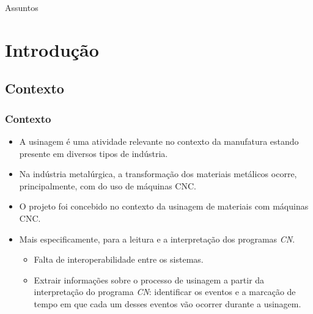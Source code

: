\documentclass[aspectratio=169]{beamer}
\begin{document}
{%
\begin{frame}{Assuntos}
  \tableofcontents
\end{frame}


\section{Introdução}

\subsection{Contexto}

\begin{frame}
  \frametitle{Contexto}

  \begin{itemize}
    \item A usinagem \'e uma atividade relevante no contexto da 
          manufatura estando presente em diversos tipos de indústria.
    \item Na ind\'ustria metal\'urgica, a transforma\c c\~ao 
          dos materiais met\'alicos ocorre, principalmente, com  
          do uso de m\'aquinas CNC.    
    \item O projeto foi concebido no contexto da usinagem de materiais 
          com máquinas CNC. 
    \item Mais especificamente, para a leitura e a interpretação dos 
          programas \emph{CN}.
    \begin{itemize}
      \item Falta de interoperabilidade entre os sistemas.
      \item Extrair informações sobre o processo de usinagem a partir da 
            interpretação do programa \emph{CN}:
            identificar os eventos e a marcação de tempo em que cada um 
            desses eventos vão ocorrer durante a usinagem.
    \end{itemize}
  \end{itemize}


\end{frame}}
\end{document}
